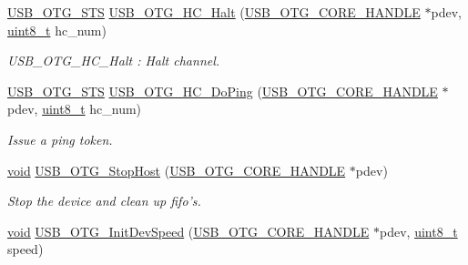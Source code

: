 \begin{DoxyCompactItemize}
\hyperlink{group___u_s_b___c_o_r_e___exported___types_ga8b6504b9af0662f17515795db0f9c8ed}{U\-S\-B\-\_\-\-O\-T\-G\-\_\-\-S\-T\-S} \hyperlink{group___u_s_b___c_o_r_e___private___functions_ga209900078bb880f30e632fc73dec0271}{U\-S\-B\-\_\-\-O\-T\-G\-\_\-\-H\-C\-\_\-\-Halt} (\hyperlink{group___u_s_b___c_o_r_e___exported___types_gaf76054c11eb8a3367907aad7ae700e80}{U\-S\-B\-\_\-\-O\-T\-G\-\_\-\-C\-O\-R\-E\-\_\-\-H\-A\-N\-D\-L\-E} $\ast$pdev, \hyperlink{stdint_8h_aba7bc1797add20fe3efdf37ced1182c5}{uint8\-\_\-t} hc\-\_\-num)
\begin{DoxyCompactList}\small\item\em U\-S\-B\-\_\-\-O\-T\-G\-\_\-\-H\-C\-\_\-\-Halt \-: Halt channel. \end{DoxyCompactList}\item 
\hyperlink{group___u_s_b___c_o_r_e___exported___types_ga8b6504b9af0662f17515795db0f9c8ed}{U\-S\-B\-\_\-\-O\-T\-G\-\_\-\-S\-T\-S} \hyperlink{group___u_s_b___c_o_r_e___private___functions_ga85c73d3fb8098abd44c7e533afe27dba}{U\-S\-B\-\_\-\-O\-T\-G\-\_\-\-H\-C\-\_\-\-Do\-Ping} (\hyperlink{group___u_s_b___c_o_r_e___exported___types_gaf76054c11eb8a3367907aad7ae700e80}{U\-S\-B\-\_\-\-O\-T\-G\-\_\-\-C\-O\-R\-E\-\_\-\-H\-A\-N\-D\-L\-E} $\ast$pdev, \hyperlink{stdint_8h_aba7bc1797add20fe3efdf37ced1182c5}{uint8\-\_\-t} hc\-\_\-num)
\begin{DoxyCompactList}\small\item\em Issue a ping token. \end{DoxyCompactList}\item 
\hyperlink{group___n_a_m_e_ga18028b8badbf1ea7e704ccac3c488e82}{void} \hyperlink{group___u_s_b___c_o_r_e___private___functions_gafff12f2c6061cc4b957999421531fa6f}{U\-S\-B\-\_\-\-O\-T\-G\-\_\-\-Stop\-Host} (\hyperlink{group___u_s_b___c_o_r_e___exported___types_gaf76054c11eb8a3367907aad7ae700e80}{U\-S\-B\-\_\-\-O\-T\-G\-\_\-\-C\-O\-R\-E\-\_\-\-H\-A\-N\-D\-L\-E} $\ast$pdev)
\begin{DoxyCompactList}\small\item\em Stop the device and clean up fifo's. \end{DoxyCompactList}\item 
\hyperlink{group___n_a_m_e_ga18028b8badbf1ea7e704ccac3c488e82}{void} \hyperlink{group___u_s_b___c_o_r_e___private___functions_ga3eb95924b533c103a88e1f8315486f55}{U\-S\-B\-\_\-\-O\-T\-G\-\_\-\-Init\-Dev\-Speed} (\hyperlink{group___u_s_b___c_o_r_e___exported___types_gaf76054c11eb8a3367907aad7ae700e80}{U\-S\-B\-\_\-\-O\-T\-G\-\_\-\-C\-O\-R\-E\-\_\-\-H\-A\-N\-D\-L\-E} $\ast$pdev, \hyperlink{stdint_8h_aba7bc1797add20fe3efdf37ced1182c5}{uint8\-\_\-t} speed)

\end{DoxyCompactItemize}
